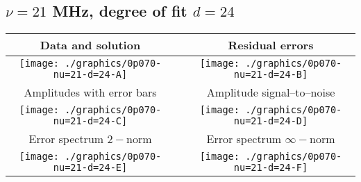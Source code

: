 

% 

\clearpage{}
\break{}

\subsection{$\nu = 21$ MHz, degree of fit $d = 24$}

\begin{table}[h]
    \begin{center}
        \begin{tabular}{ccc}
            Data and solution & \quad & Residual errors \\\hline
            \texttt{[image: ./graphics/0p070-nu=21-d=24-A]} &&
            \texttt{[image: ./graphics/0p070-nu=21-d=24-B]} \\[15pt]
            Amplitudes with error bars && Amplitude signal--to--noise \\\hline
            \texttt{[image: ./graphics/0p070-nu=21-d=24-C]} &&
            \texttt{[image: ./graphics/0p070-nu=21-d=24-D]} \\[15pt]
            Error spectrum $2-$norm && Error spectrum $\infty-$norm \\\hline
            \texttt{[image: ./graphics/0p070-nu=21-d=24-E]} &&
            \texttt{[image: ./graphics/0p070-nu=21-d=24-F]} \\[15pt]
        \end{tabular}
    \end{center}
\label{fig:elev=70, nu=21}
\end{table}



\endinput
